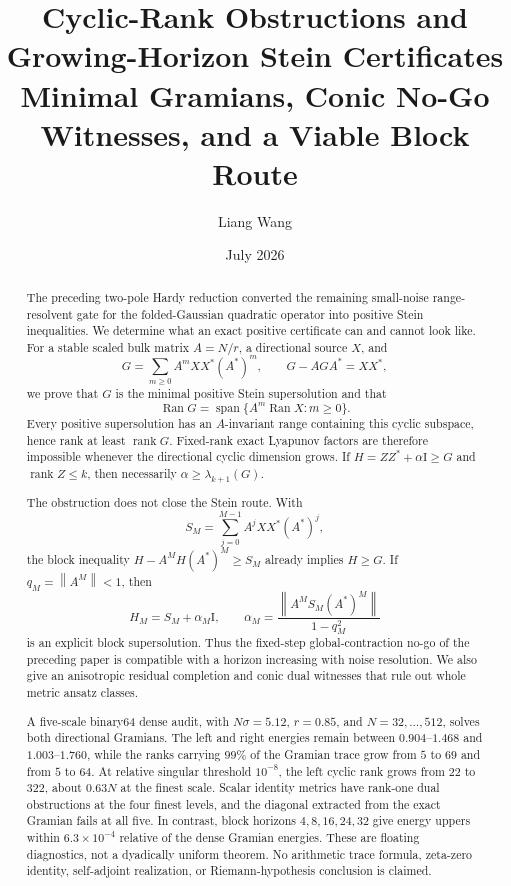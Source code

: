 \documentclass[11pt]{article}
\title{Cyclic-Rank Obstructions and Growing-Horizon Stein Certificates\\
\large Minimal Gramians, Conic No-Go Witnesses, and a Viable Block Route}
\author{Liang Wang}
\date{July 2026}
\theoremstyle{definition}
\theoremstyle{remark}
\newcommand{\Id}{\mathrm I}
\newcommand{\Ran}{\operatorname{Ran}}
\newcommand{\rank}{\operatorname{rank}}
\newcommand{\norm}[1]{\left\lVert #1\right\rVert}
\begin{document}
\maketitle

\begin{abstract}
The preceding two-pole Hardy reduction converted the remaining
small-noise range-resolvent gate for the folded-Gaussian quadratic operator
into positive Stein inequalities.  We determine what an exact positive
certificate can and cannot look like.  For a stable scaled bulk matrix
\(A=N/r\), a directional source \(X\), and
\[
 G=\sum_{m\ge0}A^mXX^*(A^*)^m,
 \qquad G-AGA^*=XX^*,
\]
we prove that \(G\) is the minimal positive Stein supersolution and that
\[
 \Ran G=\operatorname{span}\{A^m\Ran X:m\ge0\}.
\]
Every positive supersolution has an \(A\)-invariant range containing this
cyclic subspace, hence rank at least \(\rank G\).  Fixed-rank exact
Lyapunov factors are therefore impossible whenever the directional cyclic
dimension grows.  If \(H=ZZ^*+\alpha\Id\ge G\) and \(\rank Z\le k\),
then necessarily \(\alpha\ge\lambda_{k+1}(G)\).

The obstruction does not close the Stein route.  With
\[
 S_M=\sum_{j=0}^{M-1}A^jXX^*(A^*)^j,
\]
the block inequality \(H-A^MH(A^*)^M\ge S_M\) already implies \(H\ge G\).
If \(q_M=\norm{A^M}<1\), then
\[
 H_M=S_M+\alpha_M\Id,
 \qquad
 \alpha_M=\frac{\norm{A^MS_M(A^*)^M}}{1-q_M^2}
\]
is an explicit block supersolution.  Thus the fixed-step
global-contraction no-go of the preceding paper is compatible with a
horizon increasing with noise resolution.  We also give an anisotropic
residual completion and conic dual witnesses that rule out whole metric
ansatz classes.

A five-scale binary64 dense audit, with \(N\sigma=5.12\), \(r=0.85\), and
\(N=32,\ldots,512\), solves both directional Gramians.  The left and right
energies remain between \(0.904\)--\(1.468\) and \(1.003\)--\(1.760\),
while the ranks carrying \(99\%\) of the Gramian trace grow from \(5\) to
\(69\) and from \(5\) to \(64\).  At relative singular threshold
\(10^{-8}\), the left cyclic rank grows from \(22\) to \(322\), about
\(0.63N\) at the finest scale.  Scalar identity metrics have rank-one dual
obstructions at the four finest levels, and the diagonal extracted from
the exact Gramian fails at all five.  In contrast, block horizons
\(4,8,16,24,32\) give energy uppers within \(6.3\times10^{-4}\) relative
of the dense Gramian energies.  These are floating diagnostics, not a
dyadically uniform theorem.  No arithmetic trace formula, zeta-zero
identity, self-adjoint realization, or Riemann-hypothesis conclusion is
claimed.
\end{abstract}
\end{document}
